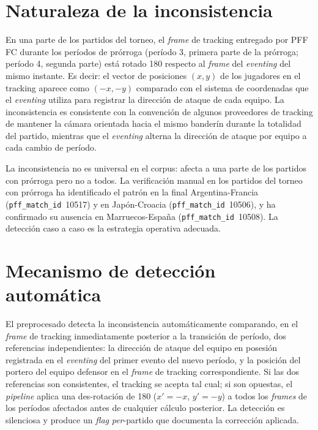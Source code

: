 \section{Naturaleza de la inconsistencia}
\label{anexo:espejo-naturaleza}

En una parte de los partidos del torneo, el \textit{frame} de
tracking entregado por PFF FC durante los períodos de prórroga
(período 3, primera parte de la prórroga; período 4, segunda parte)
está rotado 180\textdegree{} respecto al \textit{frame} del
\textit{eventing} del mismo instante. Es decir: el vector de
posiciones $(x, y)$ de los jugadores en el tracking aparece como
$(-x, -y)$ comparado con el sistema de coordenadas que el
\textit{eventing} utiliza para registrar la dirección de ataque de
cada equipo. La inconsistencia es consistente con la convención de
algunos proveedores de tracking de mantener la cámara orientada
hacia el mismo banderín durante la totalidad del partido, mientras
que el \textit{eventing} alterna la dirección de ataque por equipo
a cada cambio de período.

La inconsistencia no es universal en el corpus: afecta a una parte
de los partidos con prórroga pero no a todos. La verificación manual
en los partidos del torneo con prórroga ha identificado el patrón en
la final Argentina-Francia (\texttt{pff\_match\_id}~10517) y en
Japón-Croacia (\texttt{pff\_match\_id}~10506), y ha confirmado su
ausencia en Marruecos-España (\texttt{pff\_match\_id}~10508). La
detección caso a caso es la estrategia operativa adecuada.

\section{Mecanismo de detección automática}
\label{anexo:espejo-deteccion}

El preprocesado detecta la inconsistencia automáticamente comparando,
en el \textit{frame} de tracking inmediatamente posterior a la
transición de período, dos referencias independientes: la dirección
de ataque del equipo en posesión registrada en el \textit{eventing}
del primer evento del nuevo período, y la posición del portero del
equipo defensor en el \textit{frame} de tracking correspondiente. Si
las dos referencias son consistentes, el tracking se acepta tal cual;
si son opuestas, el \textit{pipeline} aplica una des-rotación de
180\textdegree{} ($x' = -x$, $y' = -y$) a todos los \textit{frames}
de los períodos afectados antes de cualquier cálculo posterior. La
detección es silenciosa y produce un \textit{flag} \textit{per}-partido
que documenta la corrección aplicada.

